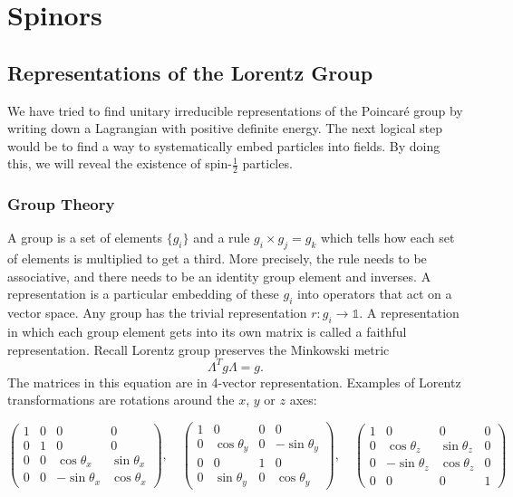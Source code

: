 \documentclass[11pt]{article}
\theoremstyle{definition}
\begin{document}
\section{Spinors}
\subsection{Representations of the Lorentz Group}
We have tried to find unitary irreducible representations of the Poincaré group by writing down a Lagrangian with positive definite energy. The next logical step would be to find a way to systematically embed particles into fields. By doing this, we will reveal the existence of spin-$\frac{1}{2}$ particles.

\subsubsection{Group Theory}
A group is a set of elements $\{g_i\}$ and a rule $g_i \times g_j = g_k$ which tells how each set of elements is multiplied to get a third. More precisely, the rule needs to be associative, and there needs to be an identity group element and inverses. A representation is a particular embedding of these $g_i$ into operators that act on a vector space. Any group has the trivial representation $r: g_i \rightarrow \mathds{1}$. A representation in which each group element gets into its own matrix is called a faithful representation.
Recall Lorentz group preserves the Minkowski metric
\begin{equation}
    \Lambda^Tg\Lambda = g.
\end{equation}
The matrices in this equation are in 4-vector representation. Examples of Lorentz transformations are rotations around the \( x \), \( y \) or \( z \) axes:

\[
\begin{pmatrix}
1 & 0 & 0 & 0 \\
0 & 1 & 0 & 0 \\
0 & 0 & \cos\theta_x & \sin\theta_x \\
0 & 0 & -\sin\theta_x & \cos\theta_x
\end{pmatrix},
\quad
\begin{pmatrix}
1 & 0 & 0 & 0 \\
0 & \cos\theta_y & 0 & -\sin\theta_y \\
0 & 0 & 1 & 0 \\
0 & \sin\theta_y & 0 & \cos\theta_y
\end{pmatrix},
\quad
\begin{pmatrix}
1 & 0 & 0 & 0 \\
0 & \cos\theta_z & \sin\theta_z & 0 \\
0 & -\sin\theta_z & \cos\theta_z & 0 \\
0 & 0 & 0 & 1
\end{pmatrix}
\]
\end{document}
